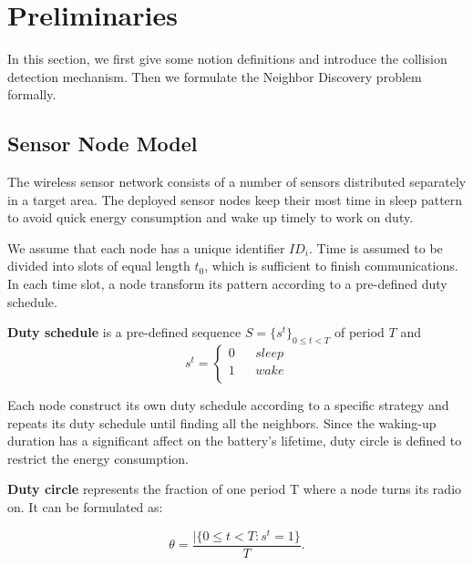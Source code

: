 \section{Preliminaries}
\label{sectionmodel}

In this section, we first give some notion definitions and introduce the collision detection mechanism. 
Then we formulate the Neighbor Discovery problem formally.  


\subsection{Sensor Node Model}

The wireless sensor network consists of a number of sensors distributed separately in a target area.
The deployed sensor nodes keep their most time in sleep pattern to avoid quick energy consumption 
and wake up timely to work on duty.

We assume that each node has a unique identifier $ID_i$. Time is assumed to be divided into slots of equal length $t_0$, 
which is sufficient to finish communications. In each time slot, a node transform its pattern according to a pre-defined duty schedule.

\begin{definition}
\textbf{Duty schedule} is a pre-defined sequence $S=\{s^t\}_{0\leq t<T}$ of period $T$ and
$$ s^t=\left\{
\begin{aligned}
0  & & {sleep}\\
1  & & {wake}\\
\end{aligned}
\right.
$$
\end{definition}

 Each node construct its own duty schedule according to a specific strategy and repeats its duty schedule 
 until finding all the neighbors. Since the waking-up duration has a significant affect on the battery's lifetime, 
 duty circle is defined to restrict the energy consumption.

\begin{definition}
\textbf{Duty circle} represents the fraction of one period T where a node turns its radio on. It can be formulated as:

$$\theta=\frac{|\{ 0\leq t<T : s^t =1\}}{T}.
$$
  
\end{definition}

